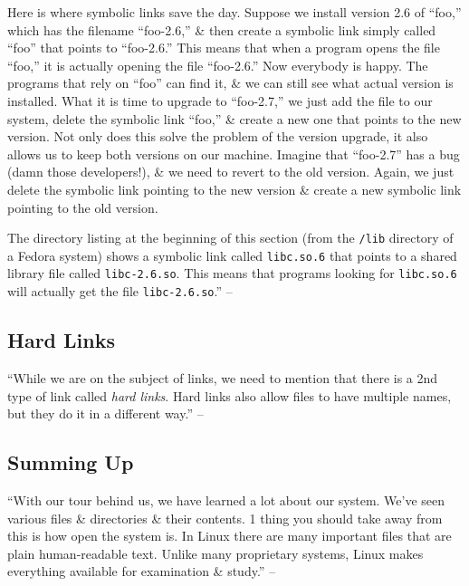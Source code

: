\documentclass[oneside]{book}
\numberwithin{equation}{section}
\begin{document}
Here is where symbolic links save the day. Suppose we install version 2.6 of ``foo,'' which has the filename ``foo-2.6,'' \& then create a symbolic link simply called ``foo'' that points to ``foo-2.6.'' This means that when a program opens the file ``foo,'' it is actually opening the file ``foo-2.6.'' Now everybody is happy. The programs that rely on ``foo'' can find it, \& we can still see what actual version is installed. What it is time to upgrade to ``foo-2.7,'' we just add the file to our system, delete the symbolic link ``foo,'' \& create a new one that points to the new version. Not only does this solve the problem of the version upgrade, it also allows us to keep both versions on our machine. Imagine that ``foo-2.7'' has a bug (damn those developers!), \& we need to revert to the old version. Again, we just delete the symbolic link pointing to the new version \& create a new symbolic link pointing to the old version.

The directory listing at the beginning of this section (from the \texttt{/lib} directory of a Fedora system) shows a symbolic link called \texttt{libc.so.6} that points to a shared library file called \texttt{libc-2.6.so}. This means that programs looking for \texttt{libc.so.6} will actually get the file \texttt{libc-2.6.so}.'' -- \cite[pp. 61--63]{Shotts2019}

\subsection{Hard Links}
``While we are on the subject of links, we need to mention that there is a 2nd type of link called \textit{hard links}. Hard links also allow files to have multiple names, but they do it in a different way.'' -- \cite[p. 63]{Shotts2019}

\subsection{Summing Up}
``With our tour behind us, we have learned a lot about our system. We've seen various files \& directories \& their contents. 1 thing you should take away from this is how open the system is. In Linux there are many important files that are plain human-readable text. Unlike many proprietary systems, Linux makes everything available for examination \& study.'' -- \cite[p. 63]{Shotts2019}

\end{document}
